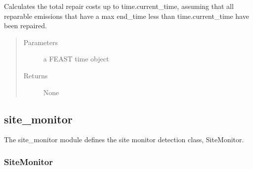\documentclass[letterpaper,10pt,english]{sphinxmanual}
\begin{document}
\begin{fulllineitems}
\begin{fulllineitems}
\end{fulllineitems}


\begin{fulllineitems}
\label{\detokenize{index:feast.DetectionModules.ldar_program.LDARProgram.calc_rep_costs}}
Calculates the total repair costs up to time.current\_time, assuming that all reparable emissions that have a
max end\_time less than time.current\_time have been repaired.
\begin{quote}\begin{description}
\item[{Parameters}] \leavevmode
{} \textendash{} a FEAST time object

\item[{Returns}] \leavevmode
None

\end{description}\end{quote}

\end{fulllineitems}


\end{fulllineitems}



\subsection{site\_monitor}
\label{\detokenize{index:module-feast.DetectionModules.site_monitor}}\label{\detokenize{index:site-monitor}}
The site\_monitor module defines the site monitor detection class, SiteMonitor.


\subsubsection{SiteMonitor}
\label{\detokenize{index:sitemonitor}}
\end{document}
